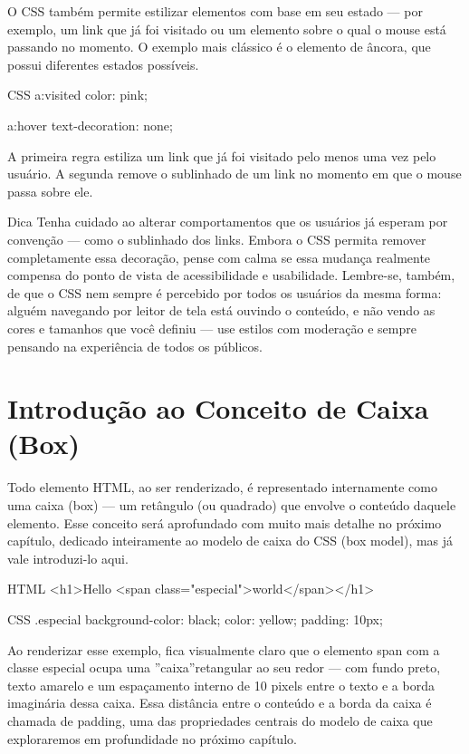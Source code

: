 O CSS também permite estilizar elementos com base em seu estado — por exemplo, um link que já foi visitado ou um elemento sobre o qual o mouse está passando no momento. O exemplo mais clássico é o elemento de âncora, que possui diferentes estados possíveis.

\begin{codebox}{CSS}
a:visited {
  color: pink;
}

a:hover {
  text-decoration: none;
}
\end{codebox}

A primeira regra estiliza um link que já foi visitado pelo menos uma vez pelo usuário. A segunda remove o sublinhado de um link no momento em que o mouse passa sobre ele.

\begin{infobox}{Dica}
Tenha cuidado ao alterar comportamentos que os usuários já esperam por convenção — como o sublinhado dos links. Embora o CSS permita remover completamente essa decoração, pense com calma se essa mudança realmente compensa do ponto de vista de acessibilidade e usabilidade. Lembre-se, também, de que o CSS nem sempre é percebido por todos os usuários da mesma forma: alguém navegando por leitor de tela está ouvindo o conteúdo, e não vendo as cores e tamanhos que você definiu — use estilos com moderação e sempre pensando na experiência de todos os públicos.
\end{infobox}

\section{Introdução ao Conceito de Caixa (Box)}

Todo elemento HTML, ao ser renderizado, é representado internamente como uma caixa (box) — um retângulo (ou quadrado) que envolve o conteúdo daquele elemento. Esse conceito será aprofundado com muito mais detalhe no próximo capítulo, dedicado inteiramente ao modelo de caixa do CSS (box model), mas já vale introduzi-lo aqui.

\begin{codebox}{HTML}
<h1>Hello <span class="especial">world</span></h1>
\end{codebox}

\begin{codebox}{CSS}
.especial {
  background-color: black;
  color: yellow;
  padding: 10px;
}
\end{codebox}

Ao renderizar esse exemplo, fica visualmente claro que o elemento span com a classe especial ocupa uma ”caixa”retangular ao seu redor — com fundo preto, texto amarelo e um espaçamento interno de 10 pixels entre o texto e a borda imaginária dessa caixa. Essa distância entre o conteúdo e a borda da caixa é chamada de padding, uma das propriedades centrais do modelo de caixa que exploraremos em profundidade no próximo capítulo.

